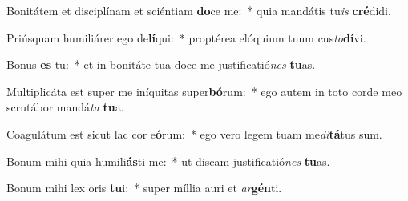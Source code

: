 \item Bonitátem et disciplínam et sciéntiam \textbf{do}ce me:~* quia mandátis tu\textit{is} \textbf{cré}didi.
\item Priúsquam humiliárer ego de\textbf{lí}qui:~* proptérea elóquium tuum cus\textit{to}\textbf{dí}vi.
\item Bonus \textbf{es} tu:~* et in bonitáte tua doce me justificatió\textit{nes} \textbf{tu}as.
\item Multiplicáta est super me iníquitas super\textbf{bó}rum:~* ego autem in toto corde meo scrutábor mandá\textit{ta} \textbf{tu}a.
\item Coagulátum est sicut lac cor e\textbf{ó}rum:~* ego vero legem tuam me\textit{di}\textbf{tá}tus sum.
\item Bonum mihi quia humili\textbf{ás}ti me:~* ut discam justificatió\textit{nes} \textbf{tu}as.
\item Bonum mihi lex oris \textbf{tu}i:~* super míllia auri et \textit{ar}\textbf{gén}ti.
